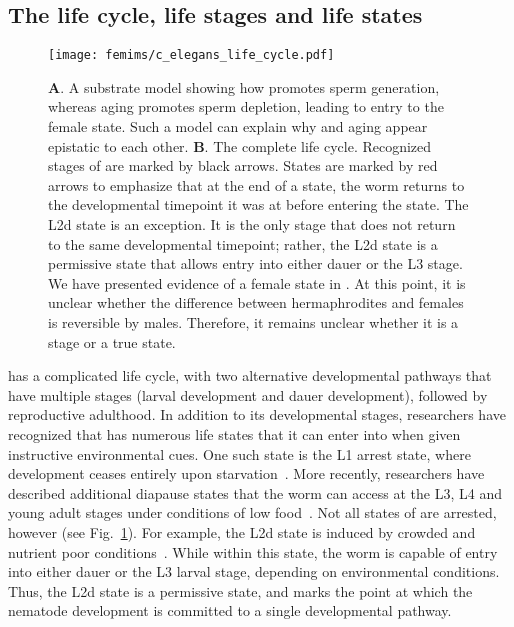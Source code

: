 \subsection*{The \cel{} life cycle, life stages and life states}

\begin{figure}
\renewcommand{\familydefault}{\sfdefault}\normalfont{}
\centering
\texttt{[image: femims/c\_elegans\_life\_cycle.pdf]}
\caption{
\textbf{A}. A substrate model showing how  promotes sperm generation,
whereas aging promotes sperm depletion, leading to entry to the female state. Such
a model can explain why  and aging appear epistatic to each other.
\textbf{B}.
The complete \cel{} life cycle. Recognized stages of \cel{} are marked by black
arrows. States are marked by red arrows to emphasize that at the end of a state,
the worm returns to the developmental timepoint it was at before entering the
state. The L2d state is an exception. It is the only stage that does not return
to the same developmental timepoint; rather, the L2d state is a permissive state
that allows entry into either dauer or the L3 stage. We have presented evidence
of a female state in \cel{}. At this point, it is unclear whether the difference
between hermaphrodites and females is reversible by males. Therefore, it remains
unclear whether it is a stage or a true state.
}%
\label{fig:lifecycle}
\end{figure}

\cel{} has a complicated life cycle, with two alternative developmental pathways
that have multiple stages (larval development and dauer development), followed
by reproductive adulthood. In addition to its developmental stages, researchers
have recognized that \cel{} has numerous life states that it can enter into when
given instructive environmental cues. One such state is the L1 arrest state,
where development ceases entirely upon starvation~\citep{Johnson1984}. More
recently, researchers have described additional diapause states that the worm
can access at the L3, L4 and young adult stages under conditions of low
food~\citep{Angelo2009,Seidel2011,Schindler2014}. Not all states of \cel{} are
arrested, however (see Fig.~\ref{fig:lifecycle}). For example, the L2d state is
induced by crowded and nutrient poor conditions~\citep{Golden1984}. While within
this state, the worm is capable of entry into either dauer or the L3 larval
stage, depending on environmental conditions. Thus, the L2d state is a
permissive state, and marks the point at which the nematode development is
committed to a single developmental pathway.

